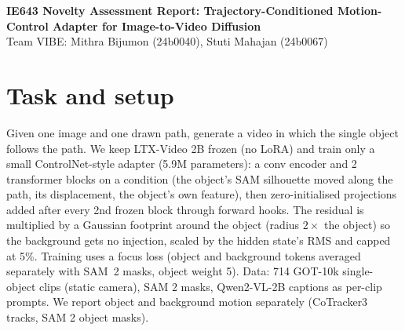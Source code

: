 \documentclass[9pt,a4paper]{extarticle}
\begin{document}
\begin{center}
{\large \textbf{IE643 Novelty Assessment Report: Trajectory-Conditioned Motion-Control Adapter for Image-to-Video Diffusion}}\\[2pt]
Team VIBE: Mithra Bijumon (24b0040), Stuti Mahajan (24b0067)
\end{center}

\section{Task and setup}
Given one image and one drawn path, generate a video in which the single object follows the path. We keep LTX-Video 2B frozen (no LoRA) and train only a small ControlNet-style adapter (5.9M parameters): a conv encoder and 2 transformer blocks on a condition (the object's SAM silhouette moved along the path, its displacement, the object's own feature), then zero-initialised projections added after every 2nd frozen block through forward hooks. The residual is multiplied by a Gaussian footprint around the object (radius $2\times$ the object) so the background gets no injection, scaled by the hidden state's RMS and capped at 5\%. Training uses a focus loss (object and background tokens averaged separately with SAM~2 masks, object weight 5). Data: 714 GOT-10k single-object clips (static camera), SAM 2 masks, Qwen2-VL-2B captions as per-clip prompts. We report object and background motion separately (CoTracker3 tracks, SAM 2 object masks).
\end{document}
